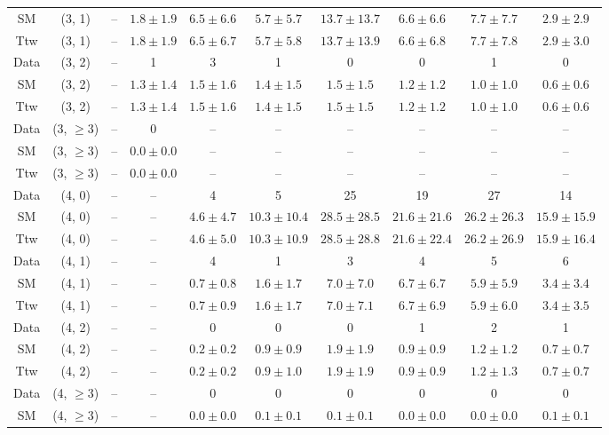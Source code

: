 \begin{table}[h!]
{\begin{tabular}{cccccccccc}
	SM & (3, 1) & -- & $1.8\pm 1.9$ & $6.5\pm 6.6$ & $5.7\pm 5.7$ & $13.7\pm 13.7$ & $6.6\pm 6.6$ & $7.7\pm 7.7$ & $2.9\pm 2.9$ \\[0.5ex] 
	Ttw & (3, 1) & -- & $1.8\pm 1.9$ & $6.5\pm 6.7$ & $5.7\pm 5.8$ & $13.7\pm 13.9$ & $6.6\pm 6.8$ & $7.7\pm 7.8$ & $2.9\pm 3.0$ \\[0.5ex] 
	Data & (3, 2) & -- & 1 & 3 & 1 & 0 & 0 & 1 & 0 \\[0.5ex] 
	SM & (3, 2) & -- & $1.3\pm 1.4$ & $1.5\pm 1.6$ & $1.4\pm 1.5$ & $1.5\pm 1.5$ & $1.2\pm 1.2$ & $1.0\pm 1.0$ & $0.6\pm 0.6$ \\[0.5ex] 
	Ttw & (3, 2) & -- & $1.3\pm 1.4$ & $1.5\pm 1.6$ & $1.4\pm 1.5$ & $1.5\pm 1.5$ & $1.2\pm 1.2$ & $1.0\pm 1.0$ & $0.6\pm 0.6$ \\[0.5ex] 
	Data & (3, $\ge3$) & -- & 0 & -- & -- & -- & -- & -- & -- \\[0.5ex] 
	SM & (3, $\ge3$) & -- & $0.0\pm 0.0$ & -- & -- & -- & -- & -- & -- \\[0.5ex] 
	Ttw & (3, $\ge3$) & -- & $0.0\pm 0.0$ & -- & -- & -- & -- & -- & -- \\[0.5ex] 
	Data & (4, 0) & -- & -- & 4 & 5 & 25 & 19 & 27 & 14 \\[0.5ex] 
	SM & (4, 0) & -- & -- & $4.6\pm 4.7$ & $10.3\pm 10.4$ & $28.5\pm 28.5$ & $21.6\pm 21.6$ & $26.2\pm 26.3$ & $15.9\pm 15.9$ \\[0.5ex] 
	Ttw & (4, 0) & -- & -- & $4.6\pm 5.0$ & $10.3\pm 10.9$ & $28.5\pm 28.8$ & $21.6\pm 22.4$ & $26.2\pm 26.9$ & $15.9\pm 16.4$ \\[0.5ex] 
	Data & (4, 1) & -- & -- & 4 & 1 & 3 & 4 & 5 & 6 \\[0.5ex] 
	SM & (4, 1) & -- & -- & $0.7\pm 0.8$ & $1.6\pm 1.7$ & $7.0\pm 7.0$ & $6.7\pm 6.7$ & $5.9\pm 5.9$ & $3.4\pm 3.4$ \\[0.5ex] 
	Ttw & (4, 1) & -- & -- & $0.7\pm 0.9$ & $1.6\pm 1.7$ & $7.0\pm 7.1$ & $6.7\pm 6.9$ & $5.9\pm 6.0$ & $3.4\pm 3.5$ \\[0.5ex] 
	Data & (4, 2) & -- & -- & 0 & 0 & 0 & 1 & 2 & 1 \\[0.5ex] 
	SM & (4, 2) & -- & -- & $0.2\pm 0.2$ & $0.9\pm 0.9$ & $1.9\pm 1.9$ & $0.9\pm 0.9$ & $1.2\pm 1.2$ & $0.7\pm 0.7$ \\[0.5ex] 
	Ttw & (4, 2) & -- & -- & $0.2\pm 0.2$ & $0.9\pm 1.0$ & $1.9\pm 1.9$ & $0.9\pm 0.9$ & $1.2\pm 1.3$ & $0.7\pm 0.7$ \\[0.5ex] 
	Data & (4, $\ge3$) & -- & -- & 0 & 0 & 0 & 0 & 0 & 0 \\[0.5ex] 
	SM & (4, $\ge3$) & -- & -- & $0.0\pm 0.0$ & $0.1\pm 0.1$ & $0.1\pm 0.1$ & $0.0\pm 0.0$ & $0.0\pm 0.0$ & $0.1\pm 0.1$ \\[0.5ex] 

\end{tabular}}
\end{table}
